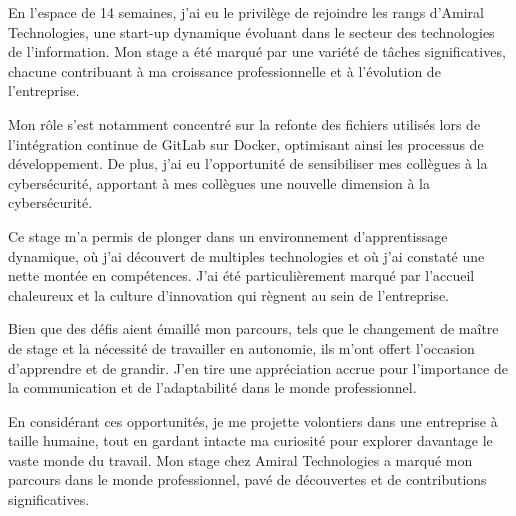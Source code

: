 En l'espace de 14 semaines, j'ai eu le privilège de rejoindre les rangs d'Amiral Technologies, une start-up dynamique évoluant dans le secteur des technologies de l'information.
Mon stage a été marqué par une variété de tâches significatives, chacune contribuant à ma croissance professionnelle et à l'évolution de l'entreprise.

Mon rôle s'est notamment concentré sur la refonte des fichiers utilisés lors de l'intégration continue de GitLab sur Docker, optimisant ainsi les processus de développement.
De plus, j'ai eu l'opportunité de sensibiliser mes collègues à la cybersécurité, apportant à mes collègues une nouvelle dimension à la cybersécurité.

Ce stage m'a permis de plonger dans un environnement d'apprentissage dynamique, où j'ai découvert de multiples technologies et où j'ai constaté une nette montée en compétences.
J'ai été particulièrement marqué par l'accueil chaleureux et la culture d'innovation qui règnent au sein de l'entreprise.

Bien que des défis aient émaillé mon parcours, tels que le changement de maître de stage et la nécessité de travailler en autonomie, ils m'ont offert l'occasion d'apprendre et de grandir.
J'en tire une appréciation accrue pour l'importance de la communication et de l'adaptabilité dans le monde professionnel.

En considérant ces opportunités, je me projette volontiers dans une entreprise à taille humaine, tout en gardant intacte ma curiosité pour explorer davantage le vaste monde du travail.
Mon stage chez Amiral Technologies a marqué mon parcours dans le monde professionnel, pavé de découvertes et de contributions significatives.
